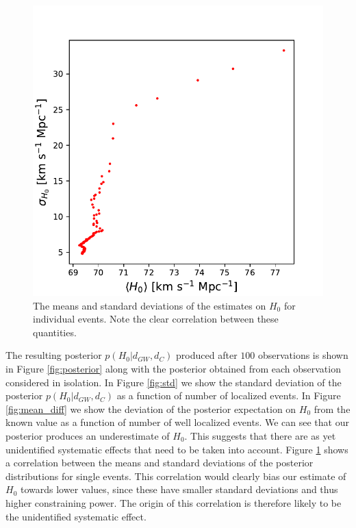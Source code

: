 \begin{figure}[t]
    \centering
    \includegraphics[width=\columnwidth]{figures/correlation.pdf}
    \caption{The means and standard deviations of the estimates on $H_0$ for individual events. Note the clear correlation between these quantities.}
    \label{fig:correlation}
\end{figure}

The resulting posterior $p(H_0 | d_{GW}, d_C)$ produced after $100$ observations is shown in Figure \ref{fig:posterior} along with the posterior obtained from each observation considered in isolation.
In Figure \ref{fig:std} we show the standard deviation of the posterior $p(H_0 | d_{GW}, d_C)$ as a function of number of localized events.
In Figure \ref{fig:mean_diff} we show the deviation of the posterior expectation on $H_0$ from the known value as a function of number of well localized events.
We can see that our posterior produces an underestimate of $H_0$.
This suggests that there are as yet unidentified systematic effects that need to be taken into account.
Figure \ref{fig:correlation} shows a correlation between the means and standard deviations of the posterior distributions for single events.
This correlation would clearly bias our estimate of $H_0$ towards lower values, since these have smaller standard deviations and thus higher constraining power.
The origin of this correlation is therefore likely to be the unidentified systematic effect.
